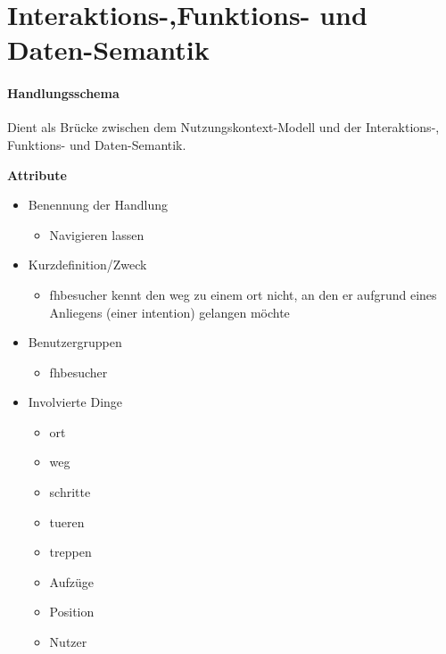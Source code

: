 \chapter{Interaktions-,Funktions- und Daten-Semantik}

\subsubsection*{Handlungsschema}
Dient als Brücke zwischen dem Nutzungskontext-Modell und der Interaktions-, Funktions- und Daten-Semantik.

\textbf{Attribute}
\begin{itemize}
\item Benennung der Handlung
    \begin{itemize}
    \item Navigieren lassen
    \end{itemize}
\item Kurzdefinition/Zweck
    \begin{itemize}
    \item \gls{fhbesucher} kennt den \gls{weg} zu einem \gls{ort}    nicht, an den er aufgrund eines Anliegens (einer \gls{intention}) gelangen möchte
    \end{itemize}
\item Benutzergruppen
    \begin{itemize}
    \item \gls{fhbesucher}
    \end{itemize}
\item Involvierte Dinge
    \begin{itemize}
    \item \gls{ort}
    \item \gls{weg}
    \item \gls{schritt}e
    \item \gls{tuer}en
    \item \gls{treppe}n
    \item Aufzüge
    \item Position
    \item Nutzer
    \end{itemize}
\end{itemize}

